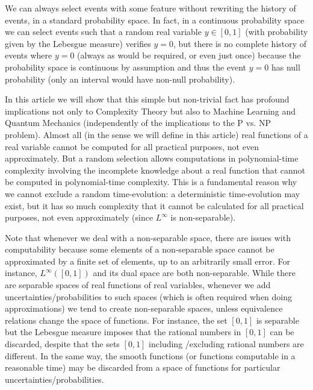 \documentclass[11pt]{book}
\begin{document}
We can always select events with some feature without rewriting the
history of events, in a standard probability space. In fact, in a
continuous probability space we can select events such that a random
real variable \(y\in [0,1]\) (with probability given by the Lebesgue
measure) verifies \(y=0\), but there is no complete history of events
where \(y=0\) (always as would be required, or even just once) because
the probability space is continuous by assumption and thus the event
\(y=0\) has null probability (only an interval would have non-null
probability).

In this article we will show that this simple but non-trivial fact has
profound implications not only to Complexity
Theory\cite{novak2008tractability}\cite{hennig2022probabilistic}\cite{ritter2000average}\cite{bna} but also to Machine
Learning\cite{hennig2022probabilistic} and Quantum Mechanics (independently of the
implications to the P vs. NP problem). Almost all (in the sense we will
define in this article) real functions of a real variable cannot be
computed for all practical purposes, not even approximately. But a
random selection allows computations in polynomial-time complexity
involving the incomplete knowledge about a real function that cannot be
computed in polynomial-time complexity. This is a fundamental reason why
we cannot exclude a random time-evolution: a deterministic
time-evolution may exist, but it has so much complexity that it cannot
be calculated for all practical purposes, not even approximately (since
\(L^\infty\) is non-separable).

Note that whenever we deal with a non-separable space, there are issues
with computability\cite{computable} because some elements of a non-separable space cannot be
approximated by a finite set of elements, up to an arbitrarily small
error. For instance, \(L^\infty([0,1])\) and its dual space are both
non-separable\cite{book}. While there
are separable spaces of real functions of real variables, whenever we
add uncertainties/probabilities to such spaces (which is often required
when doing approximations) we tend to create non-separable
spaces\cite{book}, unless equivalence
relations change the space of functions. For instance, the set \([0,1]\)
is separable but the Lebesgue measure imposes that the rational numbers
in \([0,1]\) can be discarded, despite that the sets \([0,1]\) including
/excluding rational numbers are different. In the same way, the smooth
functions (or functions computable in a reasonable time) may be
discarded from a space of functions for particular
uncertainties/probabilities.
\end{document}

